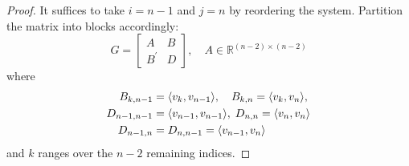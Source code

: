 \documentclass{IEEEtran}
\begin{document}
\begin{proof}
  It suffices to take $i = n-1$ and $j = n$ by reordering the system. Partition the matrix into blocks accordingly:
  \begin{equation*}
    G =
    \begin{bmatrix}
      A & B \\
      B^{\prime} & D
    \end{bmatrix},\quad  A \in \mathbb{R}^{(n-2)\times(n-2)}
  \end{equation*}
  where
  \begin{align*}
    B_{k,n-1} &= \langle v_{k}, v_{n-1}\rangle, \quad
    B_{k,n} = \langle v_{k}, v_{n}\rangle,\\
    D_{n-1,n-1} &= \langle v_{n-1}, v_{n-1}\rangle, \; D_{n,n} = \langle v_{n}, v_{n}\rangle\\
    D_{n-1,n} &= D_{n,n-1} = \langle v_{n-1}, v_{n}\rangle
  \end{align*}
  and $k$ ranges over the $n-2$ remaining indices.


\end{proof}
\end{document}
